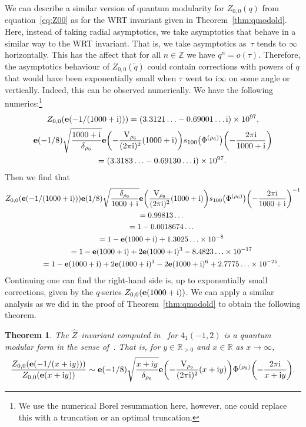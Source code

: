 \documentclass[pdftex]{sigma}
\numberwithin{equation}{section}
\newtheorem{Theorem}{Theorem}[section]
\def\BZ{\mathbb{Z}}
\def\BR{\mathbb{R}}
\def\tq{\tilde{q}}
\def\e{\mathbf e}
\def\VC{\mathrm{VC}}
\def\BZ{\mathbb Z}
\def\BR{\mathbb R}
\def\tq{\tilde{q}}
\def\VC{\mathrm{V}}
\begin{document}
We can describe a similar version of quantum modularity for $Z_{0,0}(q)$ from equation~\eqref{eq:Z00} as for the WRT invariant given in Theorem~\ref{thm:qmodold}. Here, instead of taking radial asymptotics, we take asymptotics that behave in a similar way to the WRT invariant. That is, we take asymptotics as~$\tau$ tends to $\infty$ horizontally. This has the affect that for all $n\in\BZ$ we have $q^{n}=o(\tau)$. Therefore, the asymptotics behaviour of $Z_{0,0}(\tq)$ could contain corrections with powers of $q$ that would have been exponentially small when $\tau$ went to ${\rm i}\infty$ on some angle or vertically. Indeed, this can be observed numerically. We have the following numerics:\footnote{We use the numerical Borel resummation here, however, one could replace this with a truncation or an optimal truncation.}
\begin{gather*}
 Z_{0,0}(\e(-1/(1000+{\rm i})))
  =
 (3.3121\ldots - 0.69001\dots {\rm i})\times 10^{97},\\
 \e(-1/8)\sqrt{\frac{1000+{\rm i}}{\delta_{\rho_6}}}\e\biggl(-\frac{\VC_{\rho_6}}{(2\pi {\rm i})^2}(1000+{\rm i})\biggr)s_{100}\bigl(\Phi^{(\rho_{6})}\bigr)\biggl(-\frac{2\pi {\rm i}}{1000+{\rm i}}\biggr)\\
  \qquad{}=(3.3183\ldots - 0.69130\dots {\rm i})\times 10^{97}.
\end{gather*}
Then we find that
\begin{gather*}
 Z_{0,0}(\e(-1/(1000+{\rm i})))\e(1/8) \sqrt{\frac{\delta_{\rho_6}}{1000+{\rm i}}} \e\biggl(\frac{\VC_{\rho_6}}{(2\pi {\rm i})^2}(1000+{\rm i})\biggr)s_{100}\bigl(\Phi^{(\rho_{6})}\bigr)\biggl(-\frac{2\pi {\rm i}}{1000+{\rm i}}\biggr)^{-1}\\
 \qquad{} =0.99813\ldots\\
 \qquad{} =1-0.0018674\ldots\\
 \qquad{} =1-\e(1000+{\rm i})+1.3025\ldots\times10^{-8}\\
 \qquad{} =1-\e(1000+{\rm i})+2\e(1000+{\rm i})^3-8.4823\ldots\times10^{-17}\\
 \qquad{} =1-\e(1000+{\rm i})+2\e(1000+{\rm i})^3-2\e(1000+{\rm i})^6+2.7775\ldots\times10^{-25}.
\end{gather*}
Continuing one can find the right-hand side is, up to exponentially small corrections, given by the $q$-series $Z_{0,0}(\e(1000+{\rm i}))$. We can apply a similar analysis as we did in the proof of Theorem~\ref{thm:qmodold} to obtain the following theorem.
\begin{Theorem}\label{thm:qmodold.zhat}
The $\widehat{Z}$--invariant computed in~{\rm \cite{GukovMan}} for $4_{1}(-1,2)$ is a quantum modular form in the sense of~{\rm \cite{Zagier:Qmod}}. That is, for $y\in\BR_{>0}$ and $x\in\BR$ as $x\rightarrow\infty$,
\[
 \frac{Z_{0,0}(\e(-1/(x+{\rm i}y)))}{Z_{0,0}(\e(x+{\rm i}y))}
 \sim
 \e(-1/8) \sqrt{\frac{x+{\rm i}y}{\delta_{\rho_6}}} \e\biggl(-\frac{\VC_{\rho_6}}{(2\pi {\rm i})^2}(x+{\rm i}y)\biggr)\Phi^{(\rho_{6})}\biggl(-\frac{2\pi {\rm i}}{x+{\rm i}y}\biggr) .
\]
\end{Theorem}
\end{document}
